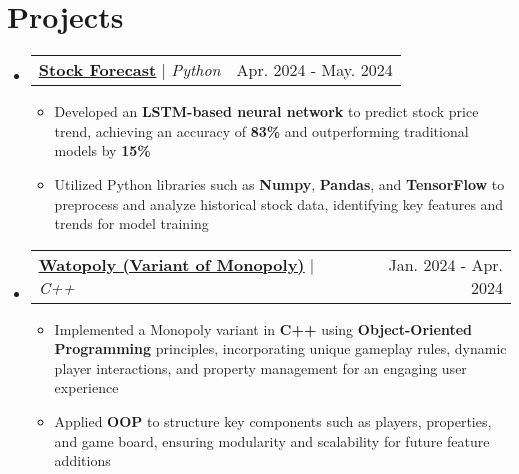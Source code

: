 \documentclass[letterpaper,11pt]{article}
\makeatletter
\newcommand{\resumeItem}[1]{
  \item\small{
    {#1 \vspace{-2pt}}
  }
}
\newcommand{\resumeProjectHeading}[2]{
    \item
    \begin{tabular*}{0.97\textwidth}{l@{\extracolsep{\fill}}r}
      \small#1 & #2 \\
    \end{tabular*}\vspace{-7pt}
}
\newcommand{\resumeSubHeadingListStart}{\begin{itemize}[leftmargin=0.15in, label={}]}
\newcommand{\resumeSubHeadingListEnd}{\end{itemize}}
\newcommand{\resumeItemListStart}{\begin{itemize}}
\newcommand{\resumeItemListEnd}{\end{itemize}\vspace{-5pt}}
\makeatother
\begin{document}
\section{Projects}
  \resumeSubHeadingListStart
    \resumeProjectHeading
      {\href{https://github.com/ThomasLiuuu/Side-Projects/tree/main/Stock-Forecast}{\underline{\textbf{Stock Forecast}}} $|$ \emph{Python}}{Apr. 2024 - May. 2024}
      \resumeItemListStart
        \resumeItem{Developed an \textbf{LSTM-based neural network} to predict stock price trend, achieving an accuracy of \textbf{83\%} and outperforming traditional models by \textbf{15\%} }
        \resumeItem{Utilized Python libraries such as \textbf{Numpy}, \textbf{Pandas}, and \textbf{TensorFlow} to preprocess and analyze historical stock data, identifying key features and trends for model training}
      \resumeItemListEnd

      \resumeProjectHeading
      {\href{https://github.com/ThomasLiuuu/Projects/tree/main/Watopoly}{\underline{\textbf{Watopoly (Variant of Monopoly)}}} $|$ \emph{C++}}{Jan. 2024 - Apr. 2024}
      \resumeItemListStart
        \resumeItem{Implemented a Monopoly variant in \textbf{C++} using \textbf{Object-Oriented Programming} principles, incorporating unique gameplay rules, dynamic player interactions, and property management for an engaging user experience}
        \resumeItem{Applied \textbf{OOP} to structure key components such as players, properties, and game board, ensuring modularity and scalability for future feature additions}
      \resumeItemListEnd

  \resumeSubHeadingListEnd
\end{document}
